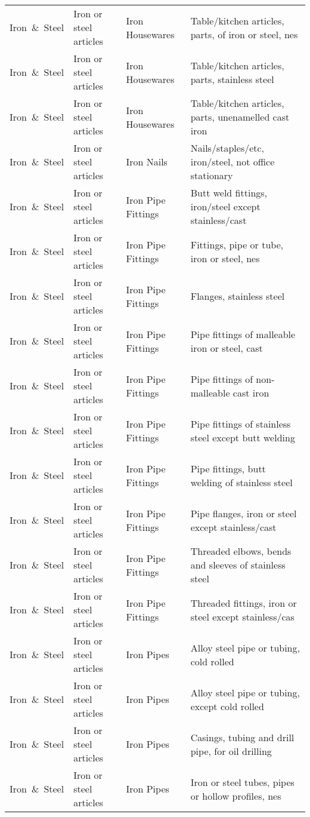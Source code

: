 \begin{appendices}
\begin{xltabular}{\textwidth}{|p{0.07\textwidth}|p{0.12\textwidth}|p{0.20\textwidth}|p{0.5\textwidth}|}
Iron\ \&\ Steel & Iron or steel articles & Iron Housewares & Table/kitchen articles, parts, of iron or steel, nes \\
Iron\ \&\ Steel & Iron or steel articles & Iron Housewares & Table/kitchen articles, parts, stainless steel \\
Iron\ \&\ Steel & Iron or steel articles & Iron Housewares & Table/kitchen articles, parts, unenamelled cast iron \\
Iron\ \&\ Steel & Iron or steel articles & Iron Nails & Nails/staples/etc, iron/steel, not office stationary \\
Iron\ \&\ Steel & Iron or steel articles & Iron Pipe Fittings & Butt weld fittings, iron/steel except stainless/cast \\
Iron\ \&\ Steel & Iron or steel articles & Iron Pipe Fittings & Fittings, pipe or tube, iron or steel, nes \\
Iron\ \&\ Steel & Iron or steel articles & Iron Pipe Fittings & Flanges, stainless steel \\
Iron\ \&\ Steel & Iron or steel articles & Iron Pipe Fittings & Pipe fittings of malleable iron or steel, cast \\
Iron\ \&\ Steel & Iron or steel articles & Iron Pipe Fittings & Pipe fittings of non-malleable cast iron \\
Iron\ \&\ Steel & Iron or steel articles & Iron Pipe Fittings & Pipe fittings of stainless steel except butt welding \\
Iron\ \&\ Steel & Iron or steel articles & Iron Pipe Fittings & Pipe fittings, butt welding of stainless steel \\
Iron\ \&\ Steel & Iron or steel articles & Iron Pipe Fittings & Pipe flanges, iron or steel except stainless/cast \\
Iron\ \&\ Steel & Iron or steel articles & Iron Pipe Fittings & Threaded elbows, bends and sleeves of stainless steel \\
Iron\ \&\ Steel & Iron or steel articles & Iron Pipe Fittings & Threaded fittings, iron or steel except stainless/cas \\
Iron\ \&\ Steel & Iron or steel articles & Iron Pipes & Alloy steel pipe or tubing, cold rolled \\
Iron\ \&\ Steel & Iron or steel articles & Iron Pipes & Alloy steel pipe or tubing, except cold rolled \\
Iron\ \&\ Steel & Iron or steel articles & Iron Pipes & Casings, tubing and drill pipe, for oil drilling \\
Iron\ \&\ Steel & Iron or steel articles & Iron Pipes & Iron or steel tubes, pipes or hollow profiles, nes \\

\end{xltabular}
\end{appendices}
